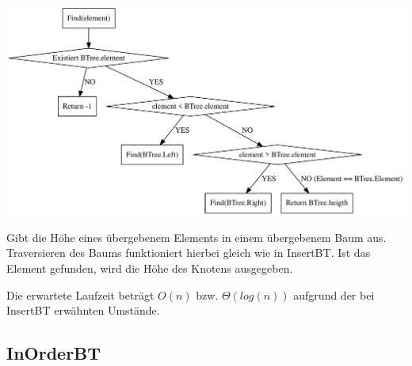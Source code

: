\documentclass[11pt]{article}
\begin{document}
    \begin{center}
        \includegraphics[width=1.1\columnwidth] {find.pdf}
    \end{center}

    Gibt die Höhe eines übergebenem Elements in einem übergebenem Baum aus.
    Traversieren des Baums funktioniert hierbei gleich wie in InsertBT.
    Ist das Element gefunden, wird die Höhe des Knotens ausgegeben.

    Die erwartete Laufzeit beträgt
    \begin{math}
        O(n)
    \end {math}
    bzw.
    \begin{math}
        \Theta (log (n))
    \end{math}
    aufgrund der bei InsertBT erwähnten Umstände.

    \subsection{InOrderBT}\label{subsec:inorderbt}
\end{document}
